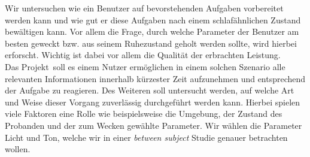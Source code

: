 Wir untersuchen wie ein Benutzer auf bevorstehenden Aufgaben vorbereitet werden kann und wie gut er diese Aufgaben nach einem schlafähnlichen Zustand bewältigen kann. 
Vor allem die Frage, durch welche Parameter der Benutzer am besten geweckt bzw. aus seinem Ruhezustand geholt werden sollte, wird hierbei erforscht. Wichtig ist dabei vor allem die Qualität der erbrachten Leistung.\\
Das Projekt \projectName \,soll es einem Nutzer ermöglichen in einem solchen Szenario alle relevanten Informationen innerhalb kürzester Zeit aufzunehmen und entsprechend der Aufgabe zu reagieren. Des Weiteren soll untersucht werden, auf welche Art und Weise dieser Vorgang zuverlässig durchgeführt werden kann. Hierbei spielen viele Faktoren eine Rolle wie beispielsweise die Umgebung, der Zustand des Probanden und der zum Wecken gewählte Parameter. Wir wählen die Parameter Licht und Ton, welche wir in einer \textit{between subject} Studie genauer betrachten wollen.
